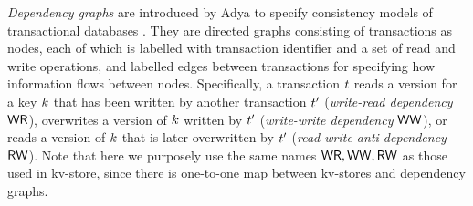\emph{Dependency graphs} are introduced by Adya to specify consistency models of transactional databases \cite{adya}. 
They are directed graphs consisting of transactions as nodes, 
each of which is labelled with transaction identifier and a set of read and write operations,
and labelled edges between transactions for specifying how information flows between nodes. 
Specifically, a transaction $t$ reads a version for a key $k$ that has been written by another transaction $t'$ 
(\emph{write-read dependency} \( \mathsf{WR}\)), overwrites a version of $k$ written by $t'$ (\emph{write-write dependency} \( \mathsf{WW} \)),
or reads a version of $k$ that is later overwritten by $t'$ (\emph{read-write anti-dependency} \( \mathsf{RW} \)).
Note that here we purposely use the same names \( \mathsf{WR}, \mathsf{WW}, \mathsf{RW} \) as those used in kv-store,
since there is one-to-one map between kv-stores and dependency graphs.

